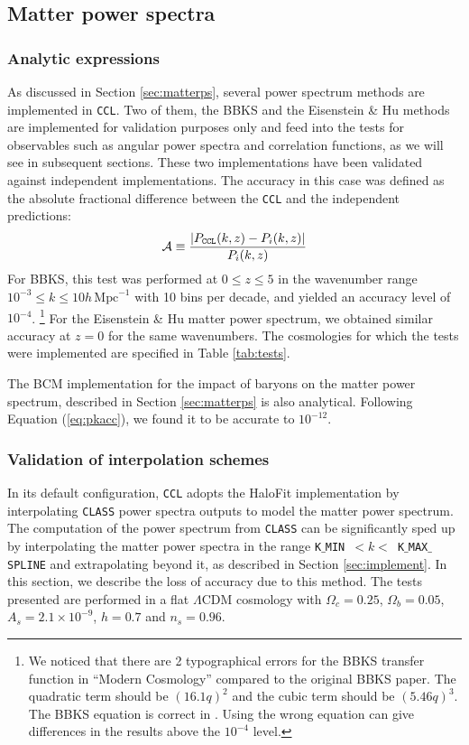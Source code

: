 \documentclass[\docopts]{\docclass}
\newcommand{\ccl}{{\tt CCL}\xspace}
\begin{document}
\subsection{Matter power spectra}

\subsubsection{Analytic expressions}

As discussed in Section \ref{sec:matterps}, several power spectrum methods are implemented in \ccl. Two of them, the BBKS \citep{BBKS} and the Eisenstein \& Hu methods are implemented for validation purposes only and feed into the tests for observables such as angular power spectra and correlation functions, as we will see in subsequent sections. These two implementations have been validated against independent implementations. The accuracy in this case was defined as the absolute fractional difference between the \ccl and the independent predictions:
\begin{equation}
  \mathcal{A}\equiv \frac{|P_{\tt CCL}(k,z)-P_{i}(k,z)|}{P_i(k,z)}
  \label{eq:pkacc}
\end{equation}
For BBKS, this test was performed at $0\leq z \leq 5$ in the wavenumber range $10^{-3} \leq k \leq 10 h\,\text{Mpc}^{-1}$ with 10 bins per decade, and yielded an accuracy level of $10^{-4}$.
\footnote{We noticed that there are 2 typographical errors for the BBKS transfer function in ``Modern Cosmology'' \citep{DodelsonBook} compared to the original BBKS paper. The quadratic term should be $(16.1q)^2$ and the cubic term should be $(5.46q)^3$. The BBKS equation is correct in \citet{PeacockBook}. Using the wrong equation can give differences in the results above the $10^{-4}$ level.}
For the Eisenstein \& Hu matter power spectrum, we obtained similar accuracy at $z=0$ for the same wavenumbers. The cosmologies for which the tests were implemented are specified in Table \ref{tab:tests}.

The BCM implementation for the impact of baryons on the matter power spectrum, described in Section \ref{sec:matterps} is also analytical. Following Equation (\ref{eq:pkacc}), we found it to be accurate to $10^{-12}$.

\subsubsection{Validation of interpolation schemes}

In its default configuration, \ccl adopts the HaloFit \citep{CLASS_halofit} implementation by interpolating {\tt CLASS} power spectra outputs to model the matter power spectrum. The computation of the power spectrum from {\tt CLASS} can be significantly sped up by interpolating the matter power spectra in the range {\tt K$\_$MIN}~$<k<$~{\tt K$\_$MAX$\_$SPLINE} and extrapolating beyond it, as described in Section \ref{sec:implement}. In this section, we describe the loss of accuracy due to this method. The tests presented are performed in a flat $\Lambda$CDM cosmology with $\Omega_c=0.25$, $\Omega_b=0.05$, $A_s=2.1\times10^{-9}$, $h=0.7$ and $n_s=0.96$.
\end{document}
